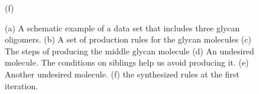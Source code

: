 \begin{figure}[ht!]
\begin{minipage}{0.45\linewidth}
    (f)
  \end{minipage}

  \caption{(a) A schematic example of a data set that includes three glycan oligomers.
    (b) A set of production rules for the glycan molecules
    (c) The steps of producing the middle glycan molecule
    (d) An undesired molecule.
    The conditions on siblings help us avoid producing it.
    (e) Another undesired molecule.
    (f) the synthesized rules at the first iteration.
  }
  \label{fig:ex-gly}
  \vspace{-7mm}
\end{figure}

